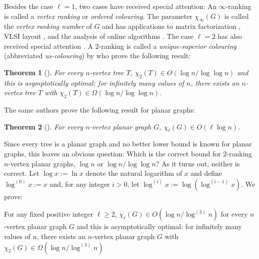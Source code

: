 \documentclass[kpfonts]{patmorin}
\newcommand{\trn}{\chi_2}
\newcommand{\lrn}{\chi_{\ell}}
\newtheorem{othertheorem}{Theorem}
\theoremstyle{named}
\begin{document}
Besides the case $\ell=1$, two cases have received special attention: An $\infty$-ranking is called a \emph{vertex ranking} or \emph{ordered colouring}. The parameter $\chi_\infty(G)$ is called the \emph{vertex ranking number} of $G$ and has applications to matrix factorization \cite{bodlaender.gilbert.ea:approximating,duff.reid:multifrontal,liu:role,dereniowski.kubale:cholesky}, VLSI layout \cite{leiserson:area,sen.deng.ea:on}, and the analysis of online algorithms \cite{even.smorodinsky:hitting}. The case $\ell=2$ has also received special attention \cite{almeter.demircan.ea:graph,karpas.neiman.ea:on,shalu.antony:complexity}. A $2$-ranking is called a \emph{unique-superior colouring} (abbreviated \emph{us-colouring}) by \citet{karpas.neiman.ea:on} who prove the following result:

\setcounter{othertheorem}{19}
\begin{othertheorem}[\cite{karpas.neiman.ea:on}]\label{trees}
    For every $n$-vertex tree $T$, $\trn(T)\in O(\log n/\log\log n)$ and this is asymptotically optimal: for infinitely many values of $n$, there exists an $n$-vertex tree $T$ with $\trn(T)\in\Omega(\log n/\log\log n)$.
\end{othertheorem}

The same authors prove the following result for planar graphs:

\setcounter{othertheorem}{15}
\begin{othertheorem}[\cite{karpas.neiman.ea:on}]\label{planar-graphs}
    For every $n$-vertex planar graph $G$, $\lrn(G)\in O(\ell\log n)$.
\end{othertheorem}

Since every tree is a planar graph and no better lower bound is known for planar graphs, this leaves an obvious question:  Which is the correct bound for 2-ranking $n$-vertex planar graphs, $\log n$ or $\log n/\log\log n$?  As it turns out, neither is correct.  Let $\log x :=\ln x$ denote the natural logarithm of $x$ and define $\log^{(0)}x:=x$ and, for any integer $i>0$, let $\log^{(i)}x:=\log(\log^{(i-1)} x)$. We prove:


\begin{thm}\label{planar}
    For any fixed positive integer $\ell\ge 2$, $\lrn(G)\in O(\log n/\log^{(3)} n)$ for every $n$-vertex planar graph $G$ and this is asymptotically optimal: for infinitely many values of $n$, there exists an $n$-vertex planar graph $G$ with $\trn(G)\in \Omega(\log n/\log^{(3)} n)$
\end{thm}
\end{document}
